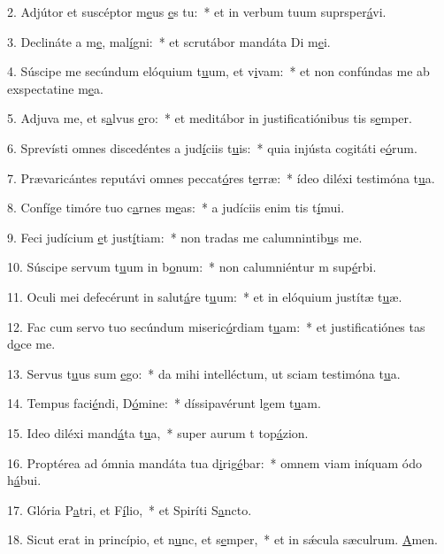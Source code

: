 2. Adjútor et suscéptor m\uline{e}us \uline{e}s tu:~* et in verbum tuum suprsper\uline{á}vi.\par 
3. Declináte a m\uline{e}, mal\uline{í}gni:~* et scrutábor mandáta Di m\uline{e}i.\par 
4. Súscipe me secúndum elóquium t\uline{u}um, et v\uline{i}vam:~* et non confúndas me ab exspectatine m\uline{e}a.\par 
5. Adjuva me, et s\uline{a}lvus \uline{e}ro:~* et meditábor in justificatiónibus tis s\uline{e}mper.\par 
6. Sprevísti omnes discedéntes a jud\uline{í}ciis t\uline{u}is:~* quia injústa cogitáti e\uline{ó}rum.\par 
7. Prævaricántes reputávi omnes peccat\uline{ó}res t\uline{e}rræ:~* ídeo diléxi testimóna t\uline{u}a.\par 
8. Confíge timóre tuo c\uline{a}rnes m\uline{e}as:~* a judíciis enim tis t\uline{í}mui.\par 
9. Feci judícium \uline{e}t just\uline{í}tiam:~* non tradas me calumnintib\uline{u}s me.\par 
10. Súscipe servum t\uline{u}um in b\uline{o}num:~* non calumniéntur m sup\uline{é}rbi.\par 
11. Oculi mei defecérunt in salut\uline{á}re t\uline{u}um:~* et in elóquium justítæ t\uline{u}æ.\par 
12. Fac cum servo tuo secúndum miseric\uline{ó}rdiam t\uline{u}am:~* et justificatiónes tas d\uline{o}ce me.\par 
13. Servus t\uline{u}us sum \uline{e}go:~* da mihi intelléctum, ut sciam testimóna t\uline{u}a.\par 
14. Tempus faci\uline{é}ndi, D\uline{ó}mine:~* díssipavérunt lgem t\uline{u}am.\par 
15. Ideo diléxi mand\uline{á}ta t\uline{u}a,~* super aurum t top\uline{á}zion.\par 
16. Proptérea ad ómnia mandáta tua d\uline{i}rig\uline{é}bar:~* omnem viam iníquam ódo h\uline{á}bui.\par 
17. Glória P\uline{a}tri, et F\uline{í}lio,~* et Spiríti S\uline{a}ncto.\par 
18. Sicut erat in princípio, et n\uline{u}nc, et s\uline{e}mper,~* et in sǽcula sæculrum. \uline{A}men.\par 
